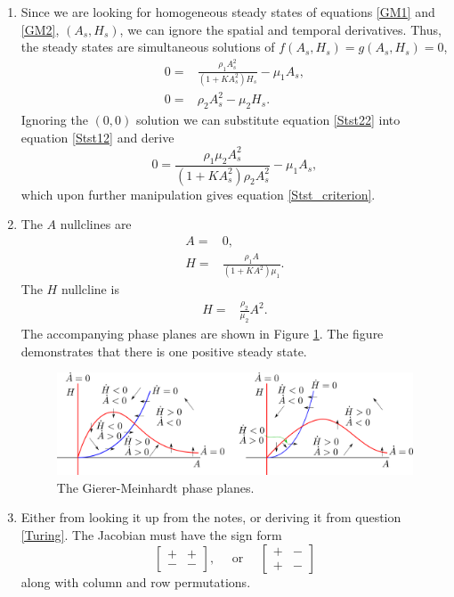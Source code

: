 \documentclass[10pt]{article}
\newcommand{\bb}{\begin{equation}}
\newcommand{\ee}{\end{equation}}
\newcommand{\fig}[1]{Figure \ref{#1}}
\newcommand{\eqn}[1]{equation \eqref{#1}}
\newcommand{\eqns}[2]{equations \eqref{#1} and \eqref{#2}}
\newcommand{\tp}{.8\textwidth}
\renewcommand{\l}{\left(}
\renewcommand{\r}{\right)}
\begin{document}
\begin{Answ}
\begin{enumerate}
\item Since we are looking for homogeneous steady states of \eqns{GM1}{GM2}, $(A_s,H_s)$, we can ignore the spatial and temporal derivatives. Thus, the steady states are simultaneous solutions of $f(A_s,H_s)=g(A_s,H_s)=0$,
\begin{align}
0=&\frac{\rho_1 A_s^2}{\l 1+KA_s^2\r H_s}-\mu_1 A_s,\label{Stst12}\\
0=&\rho_2 A_s^2-\mu_2 H_s.\label{Stst22}
\end{align}
Ignoring the $(0,0)$ solution we can substitute \eqn{Stst22} into \eqn{Stst12} and derive
\bb
0=\frac{\rho_1\mu_2 A_s^2}{\l 1+KA_s^2\r \rho_2 A_s^2}-\mu_1 A_s,
\ee
which upon further manipulation gives \eqn{Stst_criterion}.

\item The $A$ nullclines are 
\begin{align}
A=&0\label{NC1},\\
H=&\frac{\rho_1 A}{\l 1+KA^2\r \mu_1}.\label{NC2}
\end{align}
The $H$ nullcline is 
\begin{align}
H=&\frac{\rho_2}{\mu_2} A^2.\label{NC3}
\end{align}
The accompanying phase planes are shown in \fig{GM_phase_planes}. The figure demonstrates that there is one positive steady state.
\begin{figure}[h!!!tb]
\centering
\includegraphics[width=\tp]{../../Pictures/GM_phase_planes.png}
\caption{\label{GM_phase_planes} The Gierer-Meinhardt phase planes.}
\end{figure}

\item Either from looking it up from the notes, or deriving it from question \ref{Turing}. The Jacobian must have the sign form
\bb
\left[ \begin {array}{cc} + & + \\ - & -\end {array} \right],\quad \textrm{ or }\quad\left[ \begin {array}{cc} + & - \\ + & -\end {array} \right]
\ee
along with column and row permutations.


\end{enumerate}
\end{Answ}
\end{document}
